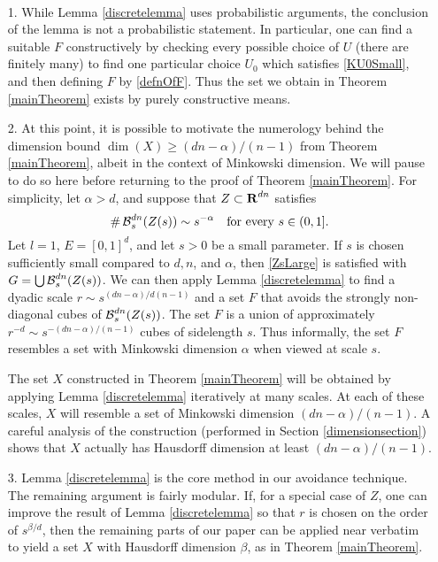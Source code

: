 \begin{remarks}
	\
	\begin{enumerate}
		\item[1.] While Lemma \ref{discretelemma} uses probabilistic arguments, the conclusion of the lemma is not a probabilistic statement. In particular, one can find a suitable $F$ constructively by checking every possible choice of $U$ (there are finitely many) to find one particular choice $U_0$ which satisfies \eqref{KU0Small}, and then defining $F$ by \eqref{defnOfF}. Thus the set we obtain in Theorem \ref{mainTheorem} exists by purely constructive means.
		
		\item[2.] At this point, it is possible to motivate the numerology behind the dimension bound $\dim(X) \geq (dn-\alpha)/(n-1)$ from Theorem \ref{mainTheorem}, albeit in the context of Minkowski dimension. We will pause to do so here before returning to the proof of Theorem \ref{mainTheorem}. For simplicity, let $\alpha > d$, and suppose that $Z \subset \operatorname{\mathbf{R}}^{dn}$ satisfies 
		\begin{equation}\label{specialCase}
			\#\operatorname{\mathcal{B}}_{s}^{dn}(Z(s)) \sim s^{-\alpha} \quad \textrm{for every}\ s \in (0,1].
		\end{equation}
		Let $l = 1$, $E = [0,1]^d$, and let $s > 0$ be a small parameter. If $s$ is chosen sufficiently small compared to $d,n$, and $\alpha$, then \eqref{ZsLarge} is satisfied with $G = \bigcup \operatorname{\mathcal{B}}^{dn}_s(Z(s))$. We can then apply Lemma \ref{discretelemma} to find a dyadic scale $r \sim s^{(dn-\alpha)/d(n-1)}$ and a set $F$ that avoids the strongly non-diagonal cubes of $\operatorname{\mathcal{B}}_{s}^{dn}(Z(s))$. The set $F$ is a union of approximately $r^{-d} \sim s^{-(dn-\alpha)/(n-1)}$ cubes of sidelength $s$. Thus informally, the set $F$ resembles a set with Minkowski dimension $\alpha$ when viewed at scale $s$. 

		The set $X$ constructed in Theorem \ref{mainTheorem} will be obtained by applying Lemma \ref{discretelemma} iteratively at many scales. At each of these scales, $X$ will resemble a set of Minkowski dimension $(dn - \alpha)/(n-1)$. A careful analysis of the construction (performed in Section \ref{dimensionsection}) shows that $X$ actually has Hausdorff dimension at least $(dn - \alpha)/(n-1)$.

		\item[3.] Lemma \ref{discretelemma} is the core method in our avoidance technique. The remaining argument is fairly modular. If, for a special case of $Z$, one can improve the result of Lemma \ref{discretelemma} so that $r$ is chosen on the order of $s^{\beta/d}$, then the remaining parts of our paper can be applied near verbatim to yield a set $X$ with Hausdorff dimension $\beta$, as in Theorem \ref{mainTheorem}. 
	\end{enumerate} 
\end{remarks}









